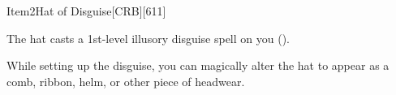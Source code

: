 
\begin{card}{Item}{2}{Hat of Disguise}[CRB][611]





The hat casts a 1st-level illusory disguise spell on you ().

While setting up the disguise, you can magically alter the hat to appear as a comb, ribbon, helm, or other piece of headwear.

\vfill

\ItemBulk{-}
\end{card}
